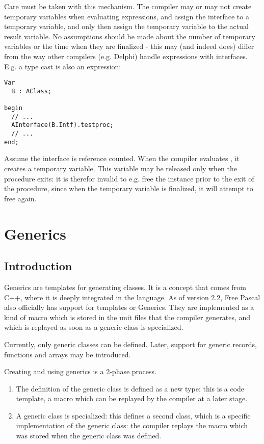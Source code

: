 Care must be taken with this mechanism. The compiler may or may not create
temporary variables when evaluating expressions, and assign the interface
to a temporary variable, and only then assign the temporary variable to 
the actual result variable. No assumptions should be made about the number
of temporary variables or the time when they are finalized - this may 
(and indeed does) differ from the way other compilers (e.g. Delphi) handle
expressions with interfaces. E.g. a type cast is also an expression:
\begin{verbatim}
Var
  B : AClass;

begin
  // ...
  AInterface(B.Intf).testproc;
  // ...
end;
\end{verbatim}
Assume the interface  is reference counted. When the compiler 
evaluates , it creates a temporary variable. This variable may be 
released only when the procedure exits: it is therefor invalid to e.g. 
free the instance  prior to the exit of the procedure, since when the 
temporary variable is finalized, it will attempt to free  again.

\chapter{Generics}
\label{ch:generics}
\section{Introduction}
Generics are templates for generating classes. It is a concept that
comes from C++, where it is deeply integrated in the language. As of
version 2.2, Free Pascal also officially has support for templates or
Generics. They are implemented as a kind of macro which is stored in the
unit files that the compiler generates, and which is replayed as soon
as a generic class is specialized.

Currently, only generic classes can be defined. Later, support for
generic records, functions and arrays may be introduced.

Creating and using generics is a 2-phase process.
\begin{enumerate}
\item The definition of the generic class is defined as a new type: 
this is a code template, a macro which can be replayed by the compiler 
at a later stage.
\item A generic class is specialized: this defines a second class,
which is a specific implementation of the generic class: the compiler
replays the macro which was stored when the generic class was defined.
\end{enumerate}

